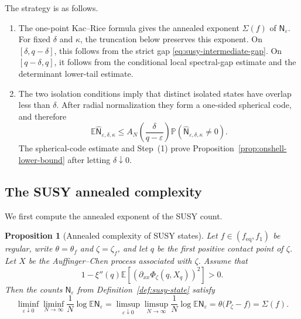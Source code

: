 \documentclass[a4paper,10pt,reqno]{amsart}
\numberwithin{equation}{section}
\newtheorem{proposition}{Proposition}[section]
\newcommand{\ve}{\varepsilon}
\newcommand{\dP}{\mathbb{P}}%
\newcommand{\dE}{\mathbb{E}}%
\newcommand{\eq}{\mathrm{eq}}
\begin{document}
	The strategy is as follows.
	\begin{enumerate}[label=\textup{(\arabic*)}]
		\item The one-point Kac--Rice formula gives the annealed exponent
		\(\Sigma(f)\) of \(\mathsf N_\ve\). For fixed \(\delta\) and
		\(\kappa\), the truncation below preserves this exponent.
		On \([\delta,q-\delta]\), this follows from the strict gap
		\eqref{eq:susy-intermediate-gap}.
		On \([q-\delta,q]\), it follows from the
		conditional local spectral-gap estimate and the determinant
		lower-tail estimate.
		\item The two isolation conditions imply that distinct isolated states
		have overlap less than \(\delta\). After radial normalization they form
		a one-sided spherical code, and therefore
		\[
		\dE\widehat{\mathsf N}_{\ve,\delta,\kappa}
		\le
		A_N\left(\frac{\delta}{q-\ve}\right)
		\dP\left(\widehat{\mathsf N}_{\ve,\delta,\kappa}\ne0\right).
		\]
		The spherical-code estimate and Step~\textup{(1)} prove
		Proposition~\ref{prop:onshell-lower-bound} after letting
		\(\delta\downarrow0\).
	\end{enumerate}
	
	\subsection{The SUSY annealed complexity}
	
	We first compute the annealed exponent of the SUSY count.
	
	\begin{proposition}[Annealed complexity of SUSY states]\label{prop:susy-annealed}
		Let \(f\in(f_{\eq},f_1)\) be regular, write
		\(\theta=\theta_f\) and \(\zeta=\zeta_f\), and let \(q\) be the first
		positive contact point of \(\zeta\). Let \(X\) be the
		Auffinger--Chen process associated with \(\zeta\). Assume that
		\[
		1-\xi''(q)\dE\left[
		\left(
		\partial_{xx}\Phi_\zeta(q,X_q)
		\right)^2
		\right]>0.
		\]
		Then the counts \(\mathsf N_\ve\) from
		Definition~\ref{def:susy-state} satisfy
		\[
		\liminf_{\ve\downarrow0}
		\liminf_{N\to\infty}
		\frac1N\log\dE\mathsf N_\ve
		=
		\limsup_{\ve\downarrow0}
		\limsup_{N\to\infty}
		\frac1N\log\dE\mathsf N_\ve
		=
		\theta\bigl(P_\zeta-f\bigr)
		=
		\Sigma(f).
		\]
	\end{proposition}
	
	
\end{document}
